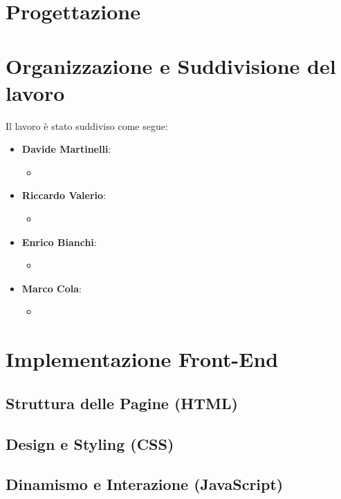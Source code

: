 \documentclass{article}
\begin{document}
\newpage

\section{Progettazione}


\newpage

\section{Organizzazione e Suddivisione del lavoro}


Il lavoro è stato suddiviso come segue:
\begin{itemize}
    \item \textbf{Davide Martinelli}: 
            \begin{itemize}
                \item
            \end{itemize}
    \item \textbf{Riccardo Valerio}: 
            \begin{itemize}
                \item 
            \end{itemize}
    \item \textbf{Enrico Bianchi}: 
            \begin{itemize}
                \item
            \end{itemize}
   \item \textbf{Marco Cola}: 
            \begin{itemize}
                \item 
            \end{itemize}
\end{itemize}
\newpage

\section{Implementazione Front-End}

\subsection{Struttura delle Pagine (HTML)}


\subsection{Design e Styling (CSS)}


\subsection{Dinamismo e Interazione (JavaScript)}
\end{document}
